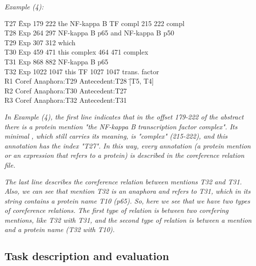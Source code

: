 \emph{Example (4)\footnotemark :}
{\selectfont
	\begin{tabbing}
		T27 \= Exp 179 222\hspace{3mm} \= the NF-kappa B TF compl 215 222 compl \\
		T28 \> Exp 264 297 \> NF-kappa B p65 and NF-kappa B p50\\
		T29 \> Exp 307 312 \> which\\
		T30 \> Exp 459 471 \> this complex \hspace{2mm}   464 471 complex \\
		T31 \> Exp 868 882 \> NF-kappa B p65\\
		T32 \> Exp 1022 1047 \> this TF   1027 1047  trans. factor\\
		R1  \hspace{5mm} \=  Coref Anaphora:T29 Antecedent:T28  \hspace{5mm}  \= [T5, T4]\\
		R2 \>  Coref Anaphora:T30 Antecedent:T27\\
		R3 \>  Coref Anaphora:T32 Antecedent:T31  \>  [T10]\\
	\end{tabbing}
}
\vspace{5mm} 

\emph{In Example (4), the first line indicates that in the offset 179-222 of the abstract there is a protein mention "the NF-kappa B transcription factor complex". Its minimal , which still carries its meaning, is "complex" (215-222), and this annotation has the index "T27". In this way, every annotation (a protein mention or an expression that refers to a protein) is described in the coreference relation file.}

\emph{The last line describes the coreference relation between mentions T32 and T31. Also, we can see that mention T32 is an anaphora and refers to T31, which in its string contains a protein name T10 (p65). So, here we see that we have two types of coreference relations. The first type of relation is between two corefering mentions, like T32 with T31, and the second type of relation is between a mention and a protein name (T32 with T10).}

\subsection{Task description and evaluation}

